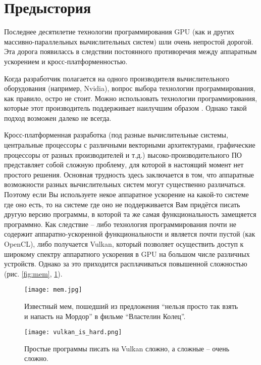 \documentclass[11pt,fleqn,english,russian]{report} %
\begin{document}
\section{Предыстория}

Последнее десятилетие технологии программирования GPU (как и других массивно-параллельных вычислительных систем) шли очень непростой дорогой. Эта дорога появилассь в следствии постоянного противоречия между аппаратным ускорением и кросс-платформенностью. 

Когда разработчик полагается на одного производителя вычислительного оборудования (например, Nvidia), вопрос выбора технологии программирования, как правило, остро не стоит. Можно использовать технологии программирования, которые этот производитель поддерживает наилучшим образом \cite{NVCPP,CUDA,OpenACC}. Однако такой подход возможен далеко не всегда. 

Кросс-платформенная разработка (под разные вычислительные системы, центральные процессоры с различными векторными архитектурами, графические процессоры от разных производителей и т.д.)  высоко-производительного ПО представляет собой сложную проблему, для которой в настоящий момент нет простого решения. Основная трудность здесь заключается в том, что аппаратные возможности разных вычислительных систем могут существенно различаться. Поэтому если Вы используете некое аппаратное ускорение на какой-то системе где оно есть, то на системе где оно не поддерживается Вам придётся писать другую версию программы, в которой та же самая функциональность замещяется программно. Как следствие -- либо технология программирования почти не содержит аппаратно-ускоренной функциональности и является почти пустой (как OpenCL), либо получается  Vulkan, который позволяет осуществить доступ к широкому спектру аппаратного ускорения в GPU на большом числе различных устройств. Однако за это приходится расплачиваться повышенной сложностью (рис. \ref{fig:mem}, \ref{fig:vulkan_complexity}). 

\begin{figure}[h]
\begin{minipage}{0.45\textwidth}
	\centering
	\texttt{[image: mem.jpg]}
	\caption{Известный мем, пошедший из предложения ``нельзя просто так взять и напасть на Мордор'' в фильме ``Властелин Колец''.}
	\label{fig:mem}
\end{minipage}
\hfill
\begin{minipage}{0.45\textwidth}
	\centering
	\texttt{[image: vulkan\_is\_hard.png]}
	\caption{Простые программы писать на Vulkan сложно, а сложные -- очень сложно.}
	\label{fig:vulkan_complexity}
\end{minipage}
\end{figure}
\end{document}
